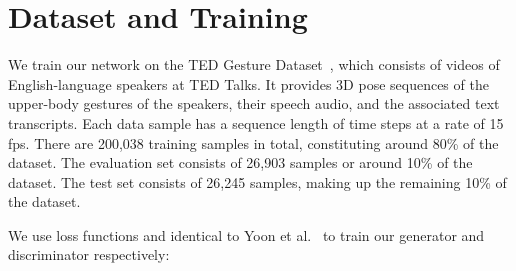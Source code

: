 \documentclass[conference,compsoc]{IEEEtran}
\theoremstyle{definition}
\begin{document}
\begin{table}[t]
    \centering
    \caption{Hyperparameters (HPs) for our network. We chose all the values via empirical search.}
    \label{tab:hyperparams}
    \vspace{-10pt}
\end{table}

\section{Dataset and Training}
We train our network on the TED Gesture Dataset~\cite{cospeech_gestures}, which consists of videos of English-language speakers at TED Talks. It provides 3D pose sequences of the upper-body gestures of the speakers, their speech audio, and the associated text transcripts. Each data sample has a sequence length of  time steps at a rate of 15 fps. There are 200,038 training samples in total, constituting around 80\% of the dataset. The evaluation set consists of 26,903 samples or around 10\% of the dataset. The test set consists of 26,245 samples, making up the remaining 10\% of the dataset.

We use loss functions  and  identical to Yoon et al.~\cite{trimodal} to train our generator and discriminator respectively:
\end{document}
